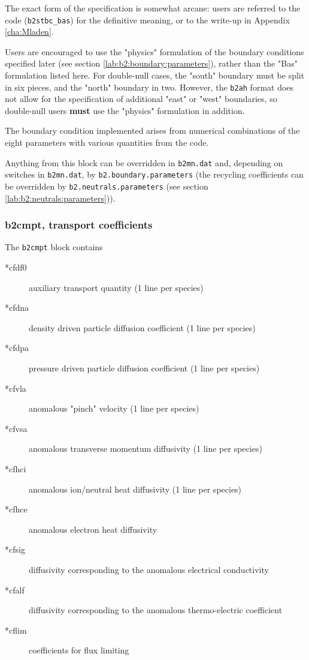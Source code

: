 \documentclass[a4paper,10pt]{report}
\begin{document}
The exact form of the specification is somewhat arcane: users are
referred to the code ({\tt b2stbc\_bas}) for the definitive meaning,
or to the write-up in Appendix \ref{cha:Mladen}.

Users are encouraged to use the "physics" formulation of the
boundary conditions specified later (see section \ref{lab:b2:boundary:parameters}),
rather than the "Bas" formulation listed here.
For double-null cases, the "south" boundary must be split in six pieces,
and the "north" boundary in two. However, the {\tt b2ah} format does
not allow for the specification of additional "east" or "west" boundaries,
so double-null users {\bf must} use the "physics" formulation in addition.

The boundary condition implemented arises from numerical combinations
of the eight parameters with various quantities from the code.

Anything from this block can be overridden in {\tt b2mn.dat} and,
depending on switches in {\tt b2mn.dat}, by
{\tt b2.boundary.\allowbreak parameters} (the recycling coefficients can be
overridden by {\tt b2.neutrals.parameters}
(see section \ref{lab:b2:neutrals:parameters})).

\subsubsection{b2cmpt, transport coefficients}
\label{lab:b2cmpt}

The {\tt b2cmpt} block contains
\begin{description}

\item[*cfdf0] auxiliary transport quantity (1 line per species)
\item[*cfdna] density driven particle diffusion coefficient (1 line per species)
\item[*cfdpa] pressure driven particle diffusion coefficient (1 line per species)
\item[*cfvla] anomalous "pinch" velocity (1 line per species)
\item[*cfvsa] anomalous transverse momentum diffusivity (1 line per species)
\item[*cfhci] anomalous ion/neutral heat diffusivity (1 line per species)
\item[*cfhce] anomalous electron heat diffusivity
\item[*cfsig] diffusivity corresponding to the anomalous electrical
  conductivity
\item[*cfalf] diffusivity corresponding to the anomalous
  thermo-electric coefficient
\item[*cflim] coefficients for flux limiting
\end{description}
\end{document}
